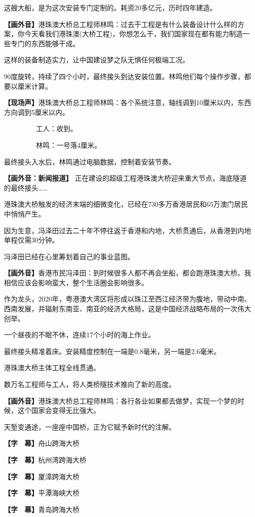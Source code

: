 \documentclass{ctexart}
\newcommand{\zkh}[1]{\textbf{\hspace{-2.7em} 【#1】}}
\begin{document}
 这艘大船，是为这次安装专门定制的。耗资20多亿元，历时四年建造。

\zkh{画外音}港珠澳大桥总工程师林鸣：过去干工程是有什么装备设计什么样的方案，你今天看我们港珠澳(大桥工程)，你想怎么干，我们国家现在都有能力制造一些专门的东西能够干成。

 这样的装备制造实力，让中国建设梦之队无惧任何极端工况。

90度旋转，持续了四个小时，最终接头到达安装位置。林鸣他们每个操作步骤，都要以厘米计算。

\zkh{现场声}港珠澳大桥总工程师林鸣：各个系统注意，轴线调到10厘米以内，东西方向调到5厘米以内。

 　 　　　 工人：收到。

 　 　　　 林鸣：一号落4厘米。

 最终接头入水后，林鸣通过电脑数据，控制着安装节奏。

 \zkh{画外音：新闻报道} 
正在建设的超级工程港珠澳大桥迎来重大节点，海底隧道的最终接头{\ldots}{\ldots}

 
港珠澳大桥触发的经济末端的细微变化，已经在730多万香港居民和65万澳门居民中悄悄产生。

因为生意，冯泽田过去二十年不停往返于香港和内地，大桥贯通后，从香港到内地单程仅需30分钟。

 冯泽田已经在心里筹划着自己的事业蓝图。

\zkh{画外音}香港市民冯泽田：到时候很多人都不再会坐船，都会跑港珠澳大桥。我相信应该会影响蛮大，整个生活圈会影响很多。

 
作为龙头，2020年，粤港澳大湾区将形成以珠江至西江经济带为腹地，带动中南、西南发展，并辐射东南亚、南亚的经济大格局，这是中国经济战略布局的一次伟大创举。

 一个昼夜的不眠不休，连续17个小时的海上作业。

 最终接头精准着床。安装精度控制在一端是0.8毫米，另一端是2.6毫米。

 港珠澳大桥主体工程全线贯通。

 数万名工程师与工人，将人类桥隧技术推向了新的高度。

\zkh{画外音}港珠澳大桥总工程师林鸣：各行各业如果都去做梦，实现一个梦的时候，这个国家会变得无比强大。

 天堑变通途，一座座中国桥，正为它赋予新时代的注解。

 \zkh{字　幕}舟山跨海大桥

 \zkh{字　幕}杭州湾跨海大桥

 \zkh{字　幕}厦漳跨海大桥

 \zkh{字　幕}平潭海峡大桥

 \zkh{字　幕}青岛跨海大桥
\end{document}
